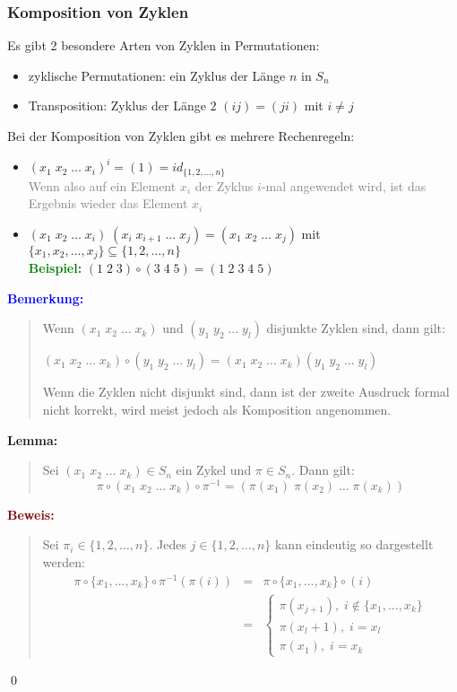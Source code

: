 \documentclass{article}
\newcommand{\gray}[1]{\textcolor{gray}{#1}}
\newcommand{\blue}[1]{\textcolor{blue}{#1}}
\newcommand{\green}[1]{\textcolor{green}{#1}}
\newcommand{\dgr}[1]{\textcolor{dgr}{#1}}
\newcommand{\maroon}[1]{\textcolor{maroon}{#1}}
\newcommand{\ex}{\green{\textbf{Beispiel: }}}
\newcommand{\an}[1]{\blue{\textbf{Bemerkung: }}\begin{quote}#1\end{quote}}
\newcommand{\lem}[1]{\dgr{\textbf{Lemma: }}\begin{quote}#1\end{quote}}
\newcommand{\pr}[1]{\maroon{\textbf{Beweis: }}\begin{quote}#1\end{quote}\qed}
\begin{document}
\subsubsection{Komposition von Zyklen}
Es gibt 2 besondere Arten von Zyklen in Permutationen:
\begin{itemize}
    \item zyklische Permutationen: ein Zyklus der Länge $n$ in $S_n$
    \item Transposition: Zyklus der Länge $2$ $(ij) = (ji)$ mit $i \neq j$
\end{itemize}

Bei der Komposition von Zyklen gibt es mehrere Rechenregeln:
\begin{itemize}
    \item $(x_1 \; x_2 \; \dots \; x_i)^i = (1) = id_{\{1, 2, \dots, n\}}$\\
    \gray{Wenn also auf ein Element $x_i$ der Zyklus $i$-mal angewendet wird, ist das Ergebnis wieder das Element $x_i$}
    \item $(x_1 \; x_2 \; \dots \; x_i) \; (x_i \; x_{i+1} \; \dots \; x_{j}) = (x_1 \; x_2 \; \dots \; x_j)$ mit $\{x_1, x_2, \dots, x_j\} \subseteq \{1, 2, \dots, n\}$\\
    \ex $(1 \; 2 \; 3) \circ (3 \; 4 \; 5) = (1 \; 2 \; 3 \; 4 \; 5)$
\end{itemize}

\an{
    Wenn $(x_1 \; x_2 \; \dots \; x_k)$ und $(y_1 \; y_2 \; \dots \; y_l)$ disjunkte Zyklen sind, dann gilt:
    \begin{center}
        $(x_1 \; x_2 \; \dots \; x_k) \circ (y_1 \; y_2 \; \dots \; y_l) = (x_1 \; x_2 \; \dots \; x_k)(y_1 \; y_2 \; \dots \; y_l)$
    \end{center}
    Wenn die Zyklen nicht disjunkt sind, dann ist der zweite Ausdruck formal nicht korrekt, wird meist jedoch als Komposition angenommen.
}

\lem{
    Sei $(x_1 \; x_2 \; \dots \; x_k) \in S_n$ ein Zykel und $\pi \in S_n$. Dann gilt:
    \begin{equation*}
        \pi \circ (x_1 \; x_2 \; \dots \; x_k) \circ \pi^{-1} = (\pi(x_1) \; \pi(x_2) \; \dots \; \pi(x_k))
    \end{equation*}
}

\pr{
    Sei $\pi_i \in \{1, 2, \dots, n\}$. Jedes $j \in \{1, 2, \dots, n\}$ kann eindeutig so dargestellt werden:
    \begin{equation*}
        \begin{array}{lcl}
            \pi \circ \{x_1, ..., x_k\} \circ \pi^{-1}(\pi(i)) & = & \pi \circ \{x_1, ..., x_k\} \circ (i)\\
            & = & 
            \begin{cases}
                \pi(x_{j+1}), \; i \notin \{x_1, ..., x_k\}\\
                \pi(x_l + 1), \; i = x_l\\
                \pi(x_1), \; i = x_k
            \end{cases}
        \end{array}
    \end{equation*}    
}
\end{document}
